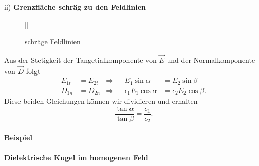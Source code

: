ii) \textbf{ Grenzfläche schräg zu den Feldlinien}\\

\begin{wrapfigure}[10]{l}[0cm]{0cm}
	\raisebox{0pt}[\dimexpr{}\baselineskip\relax]{
		\colorbox{hgrey}{
		}
	}
	\caption{schräge Feldlinien}
\end{wrapfigure}
Aus der Stetigkeit der Tangetialkomponente von $\vec{E}$ und der Normalkomponente von $\vec{D}$ folgt
\begin{align*}
E_{1t}&=E_{2t} &\Rightarrow& & E_1\sin\alpha &=E_2\sin\beta\\
D_{1n}&=D_{2n} &\Rightarrow& &\epsilon_1E_1\cos\alpha &= \epsilon_2E_2\cos\beta.
\end{align*}
Diese beiden Gleichungen können wir dividieren und erhalten
\begin{equation*}
\frac{\tan\alpha}{\tan\beta}=\frac{\epsilon_1}{\epsilon_2}.
\end{equation*}\\


\underline{\textbf{Beispiel}}
\ \\
\ \\
\textbf{Dielektrische Kugel im homogenen Feld}\\
\ \\

